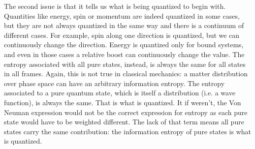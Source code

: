 \documentclass{ws-ijqi}
\begin{document}
The second issue is that it tells us what is being quantized to begin with. Quantities like energy, spin or momentum are indeed quantized in some cases, but they are not always quantized in the same way and there is a continuum of different cases. For example, spin along one direction is quantized, but we can continuously change the direction. Energy is quantized only for bound systems, and even in those cases a relative boost can continuously change the value. The entropy associated with all pure states, instead, is always the same for all states in all frames. Again, this is not true in classical mechanics: a matter distribution over phase space can have an arbitrary information entropy. The entropy associated to a pure quantum state, which is itself a distribution (i.e. a wave function), is always the same. That is what is quantized. It if weren't, the Von Neuman expression would not be the correct expression for entropy as each pure state would have to be weighted different. The lack of that term means all pure states carry the same contribution: the information entropy of pure states is what is quantized.
\end{document}
